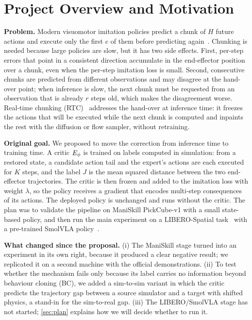 \section{Project Overview and Motivation}

\textbf{Problem.} Modern visuomotor imitation policies predict a chunk of $H$ future actions and execute only the first $e$ of them before predicting again~\cite{zhao2023act,chi2023diffusion,black2024pi0}. Chunking is needed because large policies are slow, but it has two side effects. First, per-step errors that point in a consistent direction accumulate in the end-effector position over a chunk, even when the per-step imitation loss is small. Second, consecutive chunks are predicted from different observations and may disagree at the hand-over point; when inference is slow, the next chunk must be requested from an observation that is already $r$ steps old, which makes the disagreement worse. Real-time chunking (RTC)~\cite{black2025rtc} addresses the hand-over at inference time: it freezes the actions that will be executed while the next chunk is computed and inpaints the rest with the diffusion or flow sampler, without retraining.

\textbf{Original goal.} We proposed to move the correction from inference time to training time. A critic $E_\phi$ is trained on labels computed in simulation: from a restored state, a candidate action tail and the expert's actions are each executed for $K$ steps, and the label $J$ is the mean squared distance between the two end-effector trajectories. The critic is then frozen and added to the imitation loss with weight $\lambda$, so the policy receives a gradient that encodes multi-step consequences of its actions. The deployed policy is unchanged and runs without the critic. The plan was to validate the pipeline on ManiSkill PickCube-v1 with a small state-based policy, and then run the main experiment on a LIBERO-Spatial task~\cite{liu2023libero} with a pre-trained SmolVLA policy~\cite{shukor2025smolvla}.

\textbf{What changed since the proposal.} (i) The ManiSkill stage turned into an experiment in its own right, because it produced a clear negative result; we replicated it on a second machine with the official demonstrations. (ii) To test whether the mechanism fails only because its label carries no information beyond behaviour cloning (BC), we added a sim-to-sim variant in which the critic predicts the trajectory gap between a source simulator and a target with shifted physics, a stand-in for the sim-to-real gap. (iii) The LIBERO/SmolVLA stage has not started; \cref{sec:plan} explains how we will decide whether to run it.

